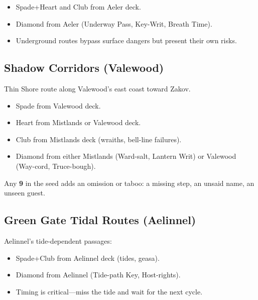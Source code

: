 \begin{itemize}
    \item Spade+Heart and Club from Aeler deck.
    \item Diamond from Aeler (Underway Pass, Key-Writ, Breath Time).
    \item Underground routes bypass surface dangers but present their own risks.
\end{itemize}

\subsection{Shadow Corridors (Valewood)}\label{subsec:shadow_corridors}

Thin Shore route along Valewood's east coast toward Zakov.

\begin{itemize}
    \item Spade from Valewood deck.
    \item Heart from Mistlands or Valewood deck.
    \item Club from Mistlands deck (wraiths, bell-line failures).
    \item Diamond from either Mistlands (Ward-salt, Lantern Writ) or Valewood (Way-cord, Truce-bough).
\end{itemize}

\begin{tcolorbox}[title=Rule of 9s, colback=red!5!white, colframe=red!75!black, sharp corners,breakable]
    Any \textbf{9} in the seed adds an omission or taboo: a missing step, an unsaid name, an unseen guest.
\end{tcolorbox}

\subsection{Green Gate Tidal Routes (Aelinnel)}\label{subsec:green_gate}

Aelinnel's tide-dependent passages:

\begin{itemize}
    \item Spade+Club from Aelinnel deck (tides, geasa).
    \item Diamond from Aelinnel (Tide-path Key, Host-rights).
    \item Timing is critical---miss the tide and wait for the next cycle.
\end{itemize}

